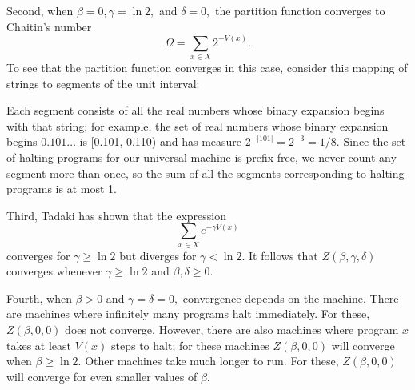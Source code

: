 \documentclass{article}
\begin{document}
Second, when $\beta = 0, \gamma = \ln 2,$ and $\delta = 0,$ the partition
function converges to Chaitin's number
\[ \Omega = \sum_{x \in X} 2^{-V(x)}.  \]
To see that the partition function converges in this case, consider 
this mapping of strings to segments of the unit interval: 
\begin{center}
\end{center}

Each segment consists of all the real numbers whose binary
expansion begins with that string; for example, the set of
real numbers whose binary expansion begins $0.101\ldots$
is [0.101, 0.110) and has measure $2^{-|101|} = 2^{-3} = 1/8.$
Since the set of halting programs for our universal machine
is prefix-free, we never count any segment more than once,
so the sum of all the segments corresponding to halting 
programs is at most 1.

Third, Tadaki has shown \cite{Tadaki2002} that the expression  
\[ \sum_{x \in X} e^{-\gamma V(x)} \]
converges for $\gamma \ge \ln 2$ but diverges for $\gamma < \ln 2.$ 
It follows that $Z(\beta, \gamma, \delta)$
converges whenever $\gamma \ge \ln 2$ and $\beta, \delta \ge 0$.  

Fourth, when $\beta>0$ and $\gamma=\delta=0,$ convergence depends 
on the machine.  There are machines where infinitely many programs 
halt immediately.  For these, $Z(\beta,0,0)$ does not converge.
However, there are also machines where program $x$ takes at least 
$V(x)$ steps to halt; for these machines $Z(\beta,0,0)$ will converge 
when $\beta \ge \ln 2.$  Other machines take much longer to run.
For these, $Z(\beta,0,0)$ will converge for even smaller values of $\beta$.  
\end{document}

